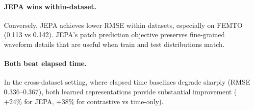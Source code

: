 \paragraph{JEPA wins within-dataset.} Conversely, JEPA achieves lower RMSE within datasets, especially on FEMTO (0.113 vs 0.142). JEPA's patch prediction objective preserves fine-grained waveform details that are useful when train and test distributions match.

\paragraph{Both beat elapsed time.} In the cross-dataset setting, where elapsed time baselines degrade sharply (RMSE 0.336--0.367), both learned representations provide substantial improvement ($+24\%$ for JEPA, $+38\%$ for contrastive vs time-only).


